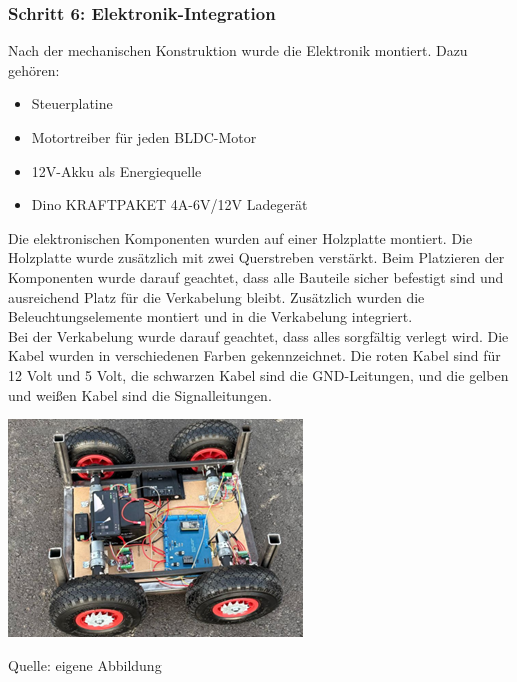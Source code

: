 \documentclass[ngerman,12pt,a4paper]{article}
\begin{document}
	 \newpage
	 \subsubsection*{Schritt 6: Elektronik-Integration}
	 
	 Nach der mechanischen Konstruktion wurde die Elektronik montiert. Dazu gehören:
	 \begin{itemize}
	 	\item Steuerplatine
	 	\item Motortreiber für jeden BLDC-Motor
	 	\item 12V-Akku als Energiequelle
	 	\item Dino KRAFTPAKET 4A-6V/12V Ladegerät
	 \end{itemize} 
	 Die elektronischen Komponenten wurden auf einer Holzplatte montiert. Die Holzplatte wurde zusätzlich mit zwei Querstreben verstärkt. Beim Platzieren der Komponenten wurde darauf geachtet, dass alle Bauteile sicher befestigt sind und ausreichend Platz für die Verkabelung bleibt. Zusätzlich wurden die Beleuchtungselemente montiert und in die Verkabelung integriert. \\[0.5cm]
	 Bei der Verkabelung wurde darauf geachtet, dass alles sorgfältig verlegt wird. Die Kabel wurden in verschiedenen Farben gekennzeichnet. Die roten Kabel sind für 12 Volt und 5 Volt, die schwarzen Kabel sind die GND-Leitungen, und die gelben und weißen Kabel sind die Signalleitungen.
	 
	 \begin{center} 
	 	\begin{minipage}[t]{0.5\textwidth}
	 		\includegraphics{Pictures/cb-verkabelt}
	 		\label{fig: cb-verkabelt}
	 		\vspace{-10pt}
	 		\begin{center}
	 			\par\small Quelle: eigene Abbildung
	 		\end{center}
	 	\end{minipage} \\[0.75cm]
	 \end{center}
	 \newpage
\end{document}
